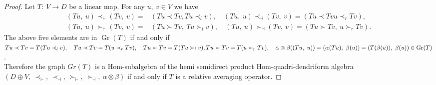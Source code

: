 \documentclass[11pt,twoside,reqno]{amsart}
\theoremstyle{plain}
\theoremstyle{definition}
\begin{document}
\begin{proof}
Let $ T : \ V \to D $ be a linear map. For any $ u  ,\ v \in V$  we have
\begin{align*}
(Tu ,\ u) \prec_\vdash (Tv ,\ v) =& (Tu \prec Tv , Tu \prec_l v),\quad
(Tu ,\ u) \prec_\dashv (Tv ,\ v) = (Tu \prec Tv  u \prec_r Tv) ,\\
(Tu ,\ u) \succ_\vdash (Tv ,\ v) = &(Tu \succ Tv,\  Tu \succ_l v),\quad (Tu ,\ u) \succ_\dashv (Tv ,\ v) = (Tu \succ Tv ,\ u \succ_r Tv).
\end{align*}
The  above  five  elements  are  in  $\operatorname{Gr}(T)$  if   and  only   if \\ 
$Tu \prec Tv = T(Tu \prec_l v)  ,\quad Tu \prec Tv = T(u \prec_r Tv),\quad
Tu \succ Tv = T(Tu \succ_l v) ,\\
Tu \succ Tv = T(u \succ_r Tv),\quad 
\alpha \otimes \beta((Tu  ,\ u))=(\alpha(Tu),\  \beta(u))=(T(\beta(u)) ,\ \beta(u)) \in \operatorname{Gr}(T)$.\\
Therefore  the graph ${Gr}(T)$  is a Hom-subalgebra of the hemi semidirect product Hom-quadri-dendriform algebra $(D \oplus V,\  \prec_\vdash ,\ \prec_\dashv,\  \succ_\vdash  ,\ \succ_\dashv ,\ \alpha \otimes \beta)$  if   and   only  if $ T $ is a relative averaging operator.
\end{proof}
\end{document}
